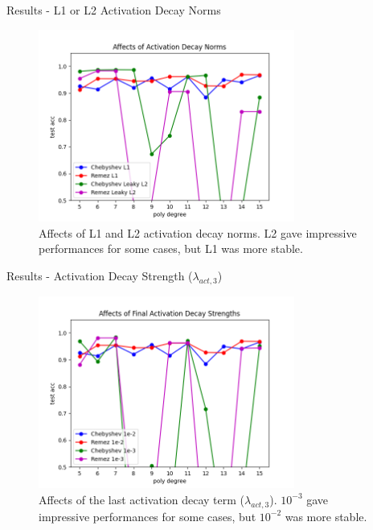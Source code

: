 \documentclass[9pt]{beamer}
\begin{document}
\begin{frame}{Results - L1 or L2 Activation Decay Norms}
    \begin{figure}[!h]
        \centering
        \includegraphics[width=0.75\textwidth]{resource/norm.png}
        \caption{Affects of L1 and L2 activation decay norms. L2 gave impressive performances for some cases, but L1 was more stable.}
        \label{fig:affects_norm}
    \end{figure}
\end{frame}

\begin{frame}{Results - Activation Decay Strength ($\lambda_{act,3}$)}
    \begin{figure}[!h]
        \centering
        \includegraphics[width=0.75\textwidth]{resource/decay.png}
        \caption{Affects of the last activation decay term ($\lambda_{act,3}$). $10^{-3}$ gave impressive performances for some cases, but $10^{-2}$ was more stable.}
        \label{fig:affects_decay}
    \end{figure}
\end{frame}
\end{document}
